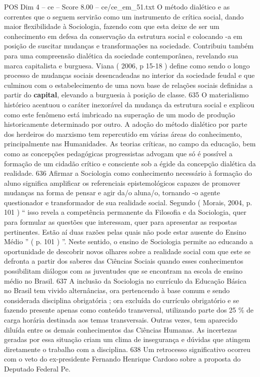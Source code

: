 \begin{textsample}{POS Dim 4 – ce – Score 8.00 – ce/ce\_em\_51.txt}
O método dialético e as correntes que o seguem servirão como um instrumento de crítica social, dando maior flexibilidade à Sociologia, fazendo com que esta deixe de ser um conhecimento em defesa da conservação da estrutura social e colocando -a em posição de suscitar mudanças e transformações na sociedade.
Contribuiu também para uma compreensão dialética da sociedade contemporânea, revelando sua marca capitalista e burguesa.
Viana ( 2006, p 15-18 ) define como sendo o longo processo de mudanças sociais desencadeadas no interior da sociedade feudal e que culminou com o estabelecimento de uma nova base de relações sociais definidas a partir do \textbf{capital}, elevando a burguesia à posição de classe. 635 O materialismo histórico acentuou o caráter inexorável da mudança da estrutura social e explicou como este fenômeno está imbricado na superação de um modo de produção historicamente determinado por outro.
A adoção do método dialético por parte dos herdeiros do marxismo tem repercutido em várias áreas do conhecimento, principalmente nas Humanidades.
As teorias críticas, no campo da educação, bem como as concepções pedagógicas progressistas advogam que só é possível a formação de um cidadão crítico e consciente sob a égide da concepção dialética da realidade. 636 Afirmar a Sociologia como conhecimento necessário à formação do aluno significa amplificar os referenciais epistemológicos capazes de promover mudanças na forma de pensar e agir da/o aluna/o, tornando -o agente questionador e transformador de sua realidade social.
Segundo ( Morais, 2004, p. 101 ) “ isso revela a competência permanente da Filosofia e da Sociologia, quer para formular as questões que interessam, quer para apresentar as respostas pertinentes.
Estão aí duas razões pelas quais não pode estar ausente do Ensino Médio ” ( p. 101 ) ”.
Neste sentido, o ensino de Sociologia permite ao educando a oportunidade de descobrir novos olhares sobre a realidade social com que este se defronta a partir dos saberes das Ciências Sociais quando esses conhecimentos possibilitam diálogos com as juventudes que se encontram na escola de ensino médio no Brasil. 637 A inclusão da Sociologia no currículo da Educação Básica no Brasil tem vivido alternâncias, ora pertencendo à base comum e sendo considerada disciplina obrigatória ; ora excluída do currículo obrigatório e se fazendo presente apenas como conteúdo transversal, utilizando parte dos 25 \% de carga horária destinada aos temas transversais.
Outras vezes, tem aparecido diluída entre os demais conhecimentos das Ciências Humanas.
As incertezas geradas por essa situação criam um clima de insegurança e dúvidas que atingem diretamente o trabalho com a disciplina. 638 Um retrocesso significativo ocorreu com o veto do ex-presidente Fernando Henrique Cardoso sobre a proposta do Deputado Federal Pe.

\end{textsample}
